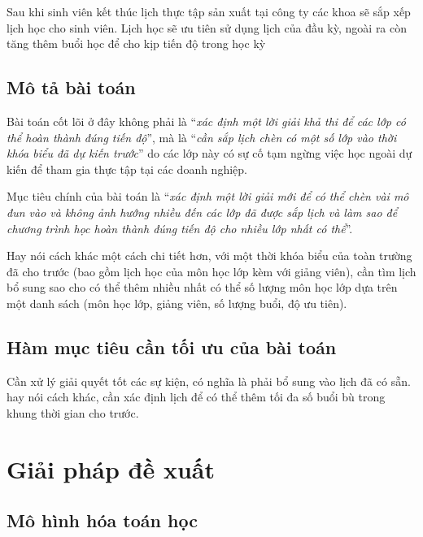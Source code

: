 \documentclass[11pt]{article}
\begin{document}
Sau khi sinh viên kết thúc lịch thực tập sản xuất tại công ty các khoa sẽ sắp xếp lịch học cho sinh viên. Lịch học sẽ ưu tiên sử dụng lịch của đầu kỳ, ngoài ra còn tăng thêm buổi học để cho kịp tiến độ trong học kỳ



\subsection{\texorpdfstring{Mô tả bài toán}{Problem statement}}


Bài toán cốt lõi ở đây không phải là “\textit{xác định một lời giải khả thi để các lớp có thể hoàn thành đúng tiến độ}”, mà là “\textit{cần sắp lịch chèn có một số lớp vào thời khóa biểu đã dự kiến trước}” do các lớp này có sự cố tạm ngừng việc học ngoài dự kiến để tham gia thực tập tại các doanh nghiệp.

Mục tiêu chính của bài toán là “\textit{xác định một lời giải mới để có thể chèn vài mô đun vào và không ảnh hướng nhiều đến các lớp đã được sắp lịch và làm sao để chương trình học hoàn thành đúng tiến độ cho nhiều lớp nhất có thể}”.

Hay nói cách khác một cách chi tiết hơn, với một thời khóa biểu của toàn trường đã cho trước (bao gồm lịch học của môn học lớp kèm với giảng viên), cần tìm lịch bổ sung sao cho có thể thêm nhiều nhất có thể số lượng môn học lớp dựa trên một danh sách (môn học lớp, giảng viên, số lượng buổi, độ ưu tiên).

\subsection{\texorpdfstring{Hàm mục tiêu cần tối ưu của bài toán}{Objective function}}

Cần xử lý giải quyết tốt các sự kiện, có nghĩa là phải bổ sung vào lịch đã có sẵn. hay nói cách khác, cần xác định lịch để có thể thêm tối đa số buổi bù trong khung thời gian cho trước.

\section{\texorpdfstring{Giải pháp đề xuất}{Proposed approach}}

\subsection{\texorpdfstring{Mô hình hóa toán học}{Modeling}}
\end{document}
